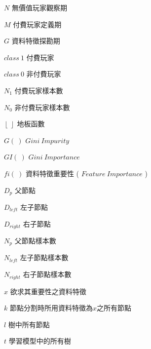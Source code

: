 %
\begin{SymEntry}

    \item[$N$]
    無價值玩家觀察期

    \item[$M$]
    付費玩家定義期

    \item[$G$]
    資料特徵探勘期

    \item[$class\ 1$]
    付費玩家

    \item[$class\ 0$]
    非付費玩家

    \item[$N_1$]
    付費玩家樣本數

    \item[$N_0$]
    非付費玩家樣本數
    
    \item[$\left \lfloor{\ }\right \rfloor$]
    地板函數

    \item[$G(\ )$]
    $Gini\ Impurity$

    \item[$GI(\ )$]
    $Gini\ Importance$

    \item[$fi(\ )$]
    資料特徵重要性 ( $Feature\ Importance$ )

    \item[$D_p$]
    父節點

    \item[$D_{left}$]
    左子節點

    \item[$D_{right}$]
    右子節點

    \item[$N_p$]
    父節點樣本數

    \item[$N_{left}$]
    左子節點樣本數

    \item[$N_{right}$]
    右子節點樣本數

    \item[$x$]
    欲求其重要性之資料特徵

    \item[$k$]
    節點分割時所用資料特徵為$x$之所有節點

    \item[$l$]
    樹中所有節點

    \item[$t$]
    學習模型中的所有樹

\end{SymEntry}